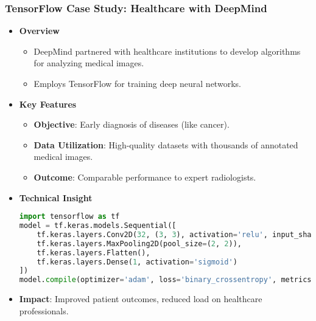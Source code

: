 \documentclass{beamer}
\begin{document}
\begin{frame}[fragile]
    \frametitle{TensorFlow Case Study: Healthcare with DeepMind}
    \begin{itemize}
        \item \textbf{Overview}
            \begin{itemize}
                \item DeepMind partnered with healthcare institutions to develop algorithms for analyzing medical images.
                \item Employs TensorFlow for training deep neural networks.
            \end{itemize}
        \item \textbf{Key Features}
            \begin{itemize}
                \item \textbf{Objective}: Early diagnosis of diseases (like cancer).
                \item \textbf{Data Utilization}: High-quality datasets with thousands of annotated medical images.
                \item \textbf{Outcome}: Comparable performance to expert radiologists.
            \end{itemize}
        \item \textbf{Technical Insight}
            \begin{lstlisting}[language=Python]
import tensorflow as tf
model = tf.keras.models.Sequential([
    tf.keras.layers.Conv2D(32, (3, 3), activation='relu', input_shape=(img_height, img_width, channels)),
    tf.keras.layers.MaxPooling2D(pool_size=(2, 2)),
    tf.keras.layers.Flatten(),
    tf.keras.layers.Dense(1, activation='sigmoid')
])
model.compile(optimizer='adam', loss='binary_crossentropy', metrics=['accuracy'])
            \end{lstlisting}
        \item \textbf{Impact}: Improved patient outcomes, reduced load on healthcare professionals.
    \end{itemize}
\end{frame}
\end{document}

